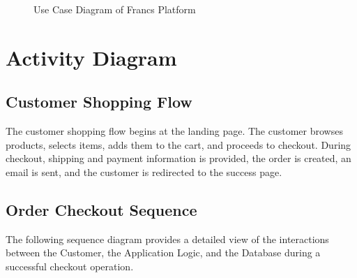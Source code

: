 \begin{figure}[H]
\caption{Use Case Diagram of Francs Platform}
\label{fig:use_case}
\end{figure}

\section{Activity Diagram}

\subsection{Customer Shopping Flow}
The customer shopping flow begins at the landing page. The customer browses products, selects items, adds them to the cart, and proceeds to checkout. During checkout, shipping and payment information is provided, the order is created, an email is sent, and the customer is redirected to the success page.

\subsection{Order Checkout Sequence}
The following sequence diagram provides a detailed view of the interactions between the Customer, the Application Logic, and the Database during a successful checkout operation.

